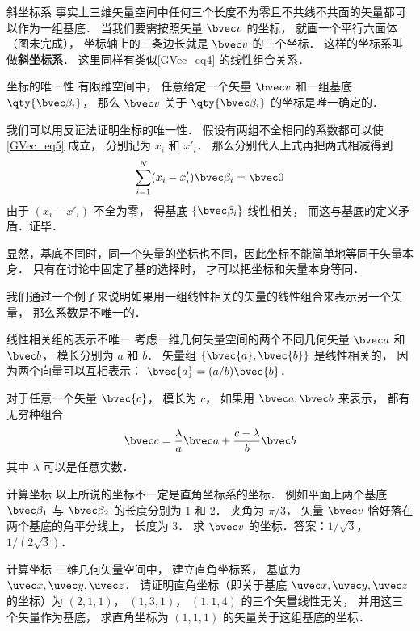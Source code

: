 \begin{example}{斜坐标系}
事实上三维矢量空间中任何三个长度不为零且不共线不共面的矢量都可以作为一组基底． 当我们要需按照矢量 $\bvec v$ 的坐标， 就画一个平行六面体（图未完成）， 坐标轴上的三条边长就是 $\bvec v$ 的三个坐标． 这样的坐标系叫做\textbf{斜坐标系}． 这里同样有类似\autoref{GVec_eq4} 的线性组合关系．
\end{example}

\begin{theorem}{坐标的唯一性}
有限维空间中， 任意给定一个矢量 $\bvec v$ 和一组基底 $\qty{\bvec \beta_i}$， 那么 $\bvec v$ 关于 $\qty{\bvec \beta_i}$ 的坐标是唯一确定的．
\end{theorem}
我们可以用反证法证明坐标的唯一性． 假设有两组不全相同的系数都可以使\autoref{GVec_eq5} 成立， 分别记为 $x_i$ 和 $x'_i$． 那么分别代入上式再把两式相减得到
\begin{equation}
\sum_{i=1}^N (x_i-x'_i) \bvec \beta_i = \bvec 0
\end{equation}
由于 $(x_i-x'_i)$ 不全为零， 得基底 $\{\bvec \beta_i\}$ 线性相关， 而这与基底的定义矛盾．证毕．

显然，基底不同时，同一个矢量的坐标也不同，因此坐标不能简单地等同于矢量本身． 只有在讨论中固定了基的选择时， 才可以把坐标和矢量本身等同．

我们通过一个例子来说明如果用一组线性相关的矢量的线性组合来表示另一个矢量， 那么系数是不唯一的．

\begin{example}{线性相关组的表示不唯一}
考虑一维几何矢量空间的两个不同几何矢量 $\bvec a$ 和 $\bvec b$， 模长分别为 $a$ 和 $b$． 矢量组 $\{\bvec{a}, \bvec{b}\}$ 是线性相关的， 因为两个向量可以互相表示： $\bvec{a}=(a/b)\bvec{b}$．

对于任意一个矢量 $\bvec{c}$， 模长为 $c$， 如果用 $\bvec a, \bvec b$ 来表示， 都有无穷种组合
\begin{equation}
\bvec c = \frac{\lambda}{a} \bvec a + \frac{c - \lambda}{b} \bvec b
\end{equation}
其中 $\lambda$ 可以是任意实数．
\end{example}

\begin{exercise}{计算坐标}
以上所说的坐标不一定是直角坐标系的坐标． 例如平面上两个基底 $\bvec \beta_1$ 与 $\bvec \beta_2$ 的长度分别为 1 和 2． 夹角为 $\pi/3$， 矢量 $\bvec v$ 恰好落在两个基底的角平分线上， 长度为 3． 求 $\bvec v$ 的坐标．答案：$1/\sqrt 3$， $1/(2\sqrt 3)$．
\end{exercise}

\begin{exercise}{计算坐标}
三维几何矢量空间中， 建立直角坐标系， 基底为 $\uvec x, \uvec y, \uvec z$． 请证明直角坐标（即关于基底 $\uvec x, \uvec y, \uvec z$ 的坐标）为 $(2, 1, 1)$， $(1, 3, 1)$， $(1, 1, 4)$ 的三个矢量线性无关， 并用这三个矢量作为基底， 求直角坐标为 $(1, 1, 1)$ 的矢量关于这组基底的坐标．
\end{exercise}

